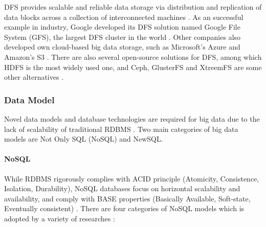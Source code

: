\documentclass[conference]{IEEEtran}
\begin{document}
DFS provides scalable and reliable data storage via distribution and
replication of data blocks across a collection of interconnected
machines \autocite{Gupta2016}. As an successful example in industry,
Google developed its DFS solution named Google File System (GFS), the
largest DFS cluster in the world \autocite{Hewage2018}. Other companies
also developed own cloud-based big data storage, such as Microsoft's
Azure and Amazon's S3 \autocite{hashem_rise_2015}. There are also
several open-source solutions for DFS, among which HDFS is the most
widely used one, and Ceph, GlusterFS and XtreemFS are some other
alternatives \autocite{Gupta2016}.

\hypertarget{data-model}{%
\subsubsection{Data Model}\label{data-model}}

Novel data models and database technologies are required for big data
due to the lack of scalability of traditional RDBMS
\autocite{Gupta2016}. Two main categories of big data models are Not
Only SQL (NoSQL) and NewSQL.

\hypertarget{nosql}{%
\paragraph{NoSQL}\label{nosql}}

While RDBMS rigorously complies with ACID principle (Atomicity,
Consistence, Isolation, Durability), NoSQL databases focus on horizontal
scalability and availability, and comply with BASE properties (Basically
Available, Soft-state, Eventually consistent) \autocite{Gupta2016}.
There are four categories of NoSQL models which is adopted by a variety
of researches
\autocite{grolinger_data_2013,hashem_rise_2015,Gupta2016,hu2014}:
\end{document}

